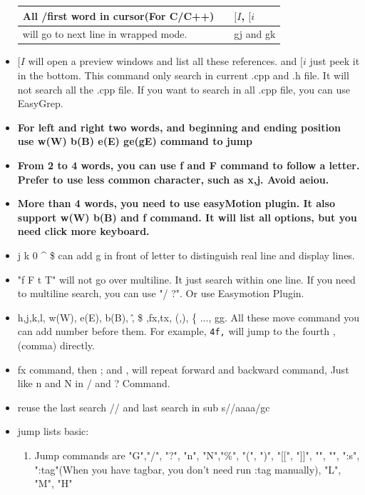 \documentclass[a4paper,11pt,twoside]{book}
\begin{document}
\begin{itemize}
\begin{center}
\begin{tabular}{|p{}|p{}|p{}|}
		\hline 
		All /first word in cursor(For C/C++) &  & $[I$, $[i$  \\ 

		\hline 
		will go to next line in wrapped mode. & &  gj and gk \\

		\hline 
\end{tabular}
\end{center} 
		\item $[I$ will open a preview windows and list all these references. and $[i$ just peek it in the bottom. This command only search in current .cpp and .h file.  It will not search all the .cpp file.  If you want to search in all .cpp file, you can use EasyGrep. 

		\item \textbf{For left and right two words, and beginning and ending position use w(W) b(B) e(E) ge(gE) command to jump}
						
		\item \textbf{From 2 to 4 words, you can use f and F command to follow a letter. Prefer to use less common character, such as x,j. Avoid aeiou.}

		\item \textbf{More than 4 words, you need to use easyMotion plugin. It also support w(W) b(B) and f command. It will list all options, but you need click more keyboard.}

		\item j k 0 \^{} \$ can add g in front of letter to distinguish real line and display lines.

		\item "f F t T" will not go over multiline. It just search within one line. If you need to multiline search, you can use "/ ?". Or use Easymotion Plugin.

		\item h,j,k,l, w(W), e(E), b(B), \^ , \$ ,fx,tx, (,), \{ ..., gg. All these move command you can add number before them. For example, \verb=4f,= will jump to the fourth ,(comma) directly.    

		\item fx command, then ; and , will repeat forward and backward command, Just like n and N in / and ? Command.

		\item reuse the last search // and last search in sub s//aaaa/gc				

		\item jump lists basic:
\begin{enumerate}
		\item Jump commands are "G","/", "?", "n", "N","\%", "(", ")", "[[", "]]", "{", "}", ":s", ":tag"(When you have tagbar, you don't need run :tag manually), "L", "M", "H"


\end{enumerate}
\end{itemize}
\end{document}
